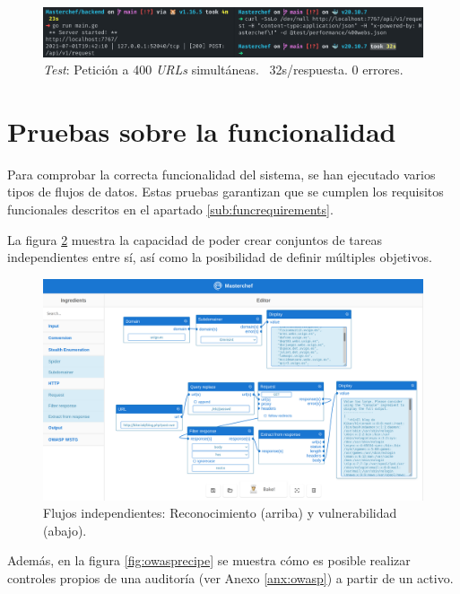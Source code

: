 \begin{figure}[H]
    \centering
    \includegraphics[width=15cm]{img/tables/32_Request-API-400URL.png}
    \caption{\textit{Test}: Petición a 400 \textit{URLs} simultáneas. ~32s/respuesta. 0 errores.}
    \label{fig:API400URL}
\end{figure}


\section{Pruebas sobre la funcionalidad} \label{sec:functest}

Para comprobar la correcta funcionalidad del sistema, se han ejecutado varios tipos de flujos de datos. Estas pruebas garantizan que se cumplen los requisitos funcionales descritos en el apartado \ref{sub:funcrequirements}.\sn

La figura \ref{fig:multiplerecipe} muestra la capacidad de poder crear conjuntos de tareas independientes entre sí, así como la posibilidad de definir múltiples objetivos.\sn

\begin{figure}[H]
    \centering
    \includegraphics[width=13cm]{img/tables/33_Recipe-Multiple.png}
    \caption{Flujos independientes: Reconocimiento (arriba) y vulnerabilidad (abajo).}
    \label{fig:multiplerecipe}
\end{figure}

Además, en la figura \ref{fig:owasprecipe} se muestra cómo es posible realizar controles propios de una auditoría (ver Anexo \ref{anx:owasp}) a partir de un activo.\sn

